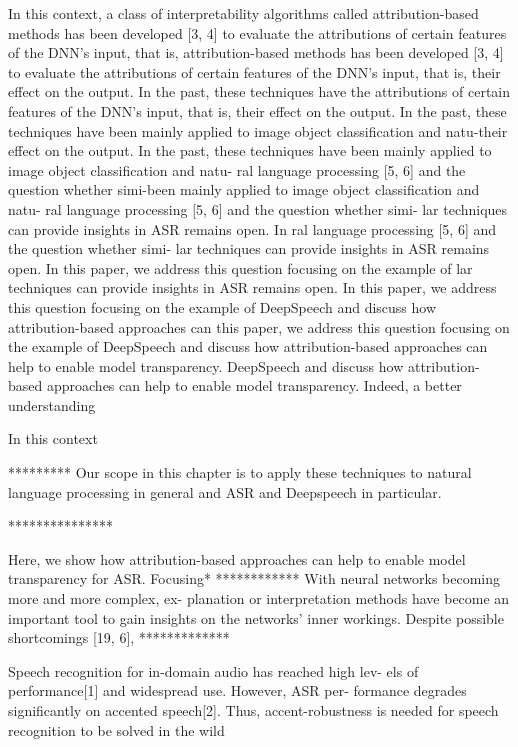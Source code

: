 In this context, a class of interpretability algorithms called attribution-based methods has been developed [3, 4] to evaluate the attributions of certain features of the DNN’s input, that is,
attribution-based methods has been developed [3, 4] to evaluate the attributions of certain features of the DNN’s input, that is, their effect on the output. In the past, these techniques have
the attributions of certain features of the DNN’s input, that is, their effect on the output. In the past, these techniques have been mainly applied to image object classification and natu-their effect on the output. In the past, these techniques have been mainly applied to image object classification and natu- ral language processing [5, 6] and the question whether simi-been mainly applied to image object classification and natu- ral language processing [5, 6] and the question whether simi- lar techniques can provide insights in ASR remains open. In
ral language processing [5, 6] and the question whether simi- lar techniques can provide insights in ASR remains open. In this paper, we address this question focusing on the example of
lar techniques can provide insights in ASR remains open. In this paper, we address this question focusing on the example of DeepSpeech and discuss how attribution-based approaches can
this paper, we address this question focusing on the example of DeepSpeech and discuss how attribution-based approaches can help to enable model transparency.
DeepSpeech and discuss how attribution-based approaches can help to enable model transparency. Indeed, a better understanding


In this context


*********
 Our scope in this chapter is to apply these techniques to natural language processing in general and ASR and Deepspeech in particular.
 
***************

Here, we show how attribution-based approaches can help
to enable model transparency for ASR. Focusing*
************
With neural networks becoming more and more complex, ex- planation or interpretation methods have become an important tool to gain insights on the networks’ inner workings. Despite possible shortcomings [19, 6], 
*************


Speech recognition for in-domain audio has reached high lev- els of performance[1] and widespread use. However, ASR per- formance degrades significantly on accented speech[2]. Thus, accent-robustness is needed for speech recognition to be solved in the wild






